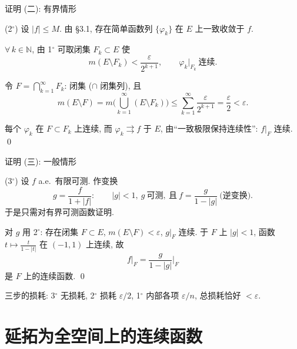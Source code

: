 
\begin{frame}{证明 (二): 有界情形}

\startproof[bg=yellow, fg=red](2$^\circ$)
设 $|f| \leqslant M$. 由 \S 3.1, 存在简单函数列 $\{\varphi_k\}$ 在 $E$ 上\alert{一致}收敛于 $f$.

\pause

$\forall\, k \in \mathbb{N}$, 由 1$^\circ$ 可取闭集 $F_k \subset E$ 使
\[
m(E \setminus F_k) < \frac{\varepsilon}{2^{k+1}},
\qquad
\varphi_k\big|_{F_k}\ \text{连续}.
\]

\pause

令 $F = \bigcap_{k=1}^{\infty} F_k$: 闭集 ($\cap$ 闭集列), 且
\[
m(E \setminus F)
= m\Big(\bigcup_{k=1}^{\infty} (E \setminus F_k)\Big)
\leqslant \sum_{k=1}^{\infty} \frac{\varepsilon}{2^{k+1}} = \frac{\varepsilon}{2} < \varepsilon .
\]

\pause

每个 $\varphi_k$ 在 $F \subset F_k$ 上连续, 而 $\varphi_k \rightrightarrows f$ 于 $E$, 由``一致极限保持连续性'':
$f\big|_F$ 连续.
\qed

\end{frame}


\begin{frame}{证明 (三): 一般情形}

\startproof[bg=yellow, fg=red](3$^\circ$)
设 $f$ a.e.\ 有限可测. 作变换
\[
g = \frac{f}{1 + |f|}:
\qquad
|g| < 1,\ g\ \text{可测},\ \text{且}\ f = \frac{g}{1 - |g|}\ \text{(逆变换)}.
\]
于是\alert{只需对有界可测函数证明}.

\pause

对 $g$ 用 2$^\circ$: 存在闭集 $F \subset E$, $m(E \setminus F) < \varepsilon$, $g\big|_F$ 连续.
于 $F$ 上 $|g| < 1$, 函数 $t \mapsto \frac{t}{1 - |t|}$ 在 $(-1, 1)$ 上连续, 故
\[
f\big|_F = \frac{g}{1 - |g|}\bigg|_F
\]
是 $F$ 上的连续函数.
\qed

\pause

\begin{remark}
三步的损耗: 3$^\circ$ 无损耗, 2$^\circ$ 损耗 $\varepsilon/2$, 1$^\circ$ 内部各项 $\varepsilon/n$, 总损耗恰好 $< \varepsilon$.
\end{remark}

\end{frame}


\section[延拓定理]{延拓为全空间上的连续函数}


